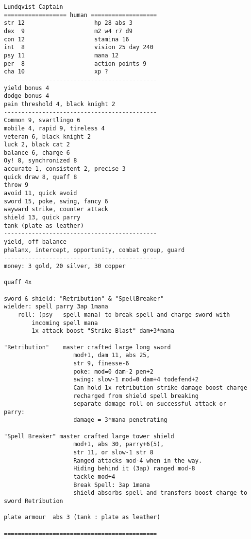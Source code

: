 \goodbreak \small \begin{samepage} \begin{verbatim}
Lundqvist Captain
================== human ===================
str 12                    hp 28 abs 3
dex  9                    m2 w4 r7 d9
con 12                    stamina 16
int  8                    vision 25 day 240
psy 11                    mana 12
per  8                    action points 9
cha 10                    xp ?
--------------------------------------------
yield bonus 4
dodge bonus 4
pain threshold 4, black knight 2
--------------------------------------------
Common 9, svartlingo 6
mobile 4, rapid 9, tireless 4
veteran 6, black knight 2
luck 2, black cat 2
balance 6, charge 6
Oy! 8, synchronized 8
accurate 1, consistent 2, precise 3
quick draw 8, quaff 8
throw 9
avoid 11, quick avoid
sword 15, poke, swing, fancy 6
wayward strike, counter attack
shield 13, quick parry
tank (plate as leather)
--------------------------------------------
yield, off balance
phalanx, intercept, opportunity, combat group, guard
--------------------------------------------
money: 3 gold, 20 silver, 30 copper

quaff 4x

sword & shield: "Retribution" & "SpellBreaker"
wielder: spell parry 3ap 1mana
    roll: (psy - spell mana) to break spell and charge sword with
        incoming spell mana
        1x attack boost "Strike Blast" dam+3*mana

"Retribution"    master crafted large long sword
                    mod+1, dam 11, abs 25,
                    str 9, finesse-6
                    poke: mod=0 dam-2 pen+2
                    swing: slow-1 mod=0 dam+4 todefend+2
                    Can hold 1x retribution strike damage boost charge
                    recharged from shield spell breaking
                    separate damage roll on successful attack or parry:
                    damage = 3*mana penetrating

"Spell Breaker" master crafted large tower shield
                    mod+1, abs 30, parry+6(5),
                    str 11, or slow-1 str 8
                    Ranged attacks mod-4 when in the way.
                    Hiding behind it (3ap) ranged mod-8
                    tackle mod+4
                    Break Spell: 3ap 1mana
                    shield absorbs spell and transfers boost charge to sword Retribution

plate armour  abs 3 (tank : plate as leather)

============================================
\end{verbatim} \end{samepage} \normalsize

